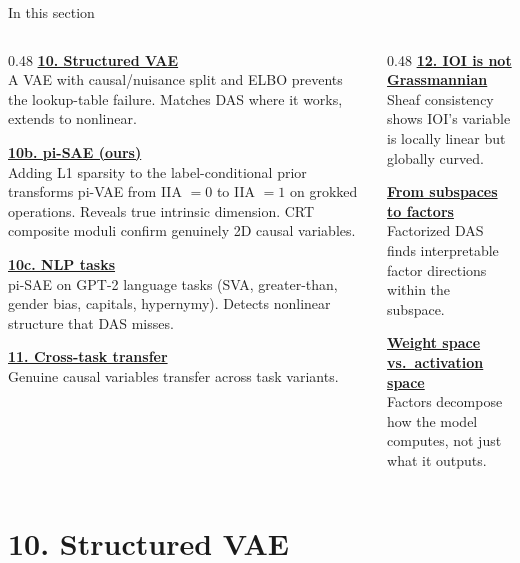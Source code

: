 \documentclass[aspectratio=169,11pt]{beamer}
\begin{document}
\begin{frame}{In this section}
\begin{columns}[T]
\begin{column}{0.48\textwidth}
\textbf{\hyperlink{sec10}{10. Structured VAE}}\\[0.2em]
{\small A VAE with causal/nuisance split and ELBO prevents the lookup-table failure. Matches DAS where it works, extends to nonlinear.}

\vspace{0.4em}
\textbf{\hyperlink{sec10b}{10b. pi-SAE (ours)}}\\[0.2em]
{\small Adding L1 sparsity to the label-conditional prior transforms pi-VAE from IIA $= 0$ to IIA $= 1$ on grokked operations. Reveals true intrinsic dimension. CRT composite moduli confirm genuinely 2D causal variables.}

\vspace{0.4em}
\textbf{\hyperlink{sec10c}{10c. NLP tasks}}\\[0.2em]
{\small pi-SAE on GPT-2 language tasks (SVA, greater-than, gender bias, capitals, hypernymy). Detects nonlinear structure that DAS misses.}

\vspace{0.4em}
\textbf{\hyperlink{sec11}{11. Cross-task transfer}}\\[0.2em]
{\small Genuine causal variables transfer across task variants.}
\end{column}
\begin{column}{0.48\textwidth}
\textbf{\hyperlink{sec12}{12. IOI is not Grassmannian}}\\[0.2em]
{\small Sheaf consistency shows IOI's variable is locally linear but globally curved.}

\vspace{0.4em}
\textbf{\hyperlink{sec12b}{From subspaces to factors}}\\[0.2em]
{\small Factorized DAS finds interpretable factor directions within the subspace.}

\vspace{0.4em}
\textbf{\hyperlink{sec12c}{Weight space vs.\ activation space}}\\[0.2em]
{\small Factors decompose how the model computes, not just what it outputs.}
\end{column}
\end{columns}
\end{frame}

\hypertarget{sec10}{}
\section{10. Structured VAE}
\end{document}
